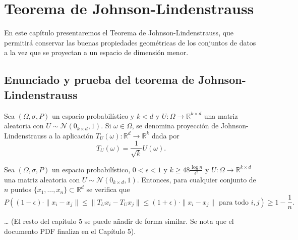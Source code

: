 \chapter{Teorema de Johnson-Lindenstrauss}

En este capítulo presentaremos el Teorema de Johnson-Lindenstrauss, que permitirá conservar las buenas propiedades geométricas de los conjuntos de datos a la vez que se proyectan a un espacio de dimensión menor.

\section{Enunciado y prueba del teorema de Johnson-Lindenstrauss}

\begin{definition}
Sea $(\Omega, \sigma, P)$ un espacio probabilístico y $k < d$ y $U : \Omega \to \mathbb{R}^{k \times d}$ una matriz aleatoria con $U \sim \mathcal{N}(0_{k \times d}, 1)$. Si $\omega \in \Omega$, se denomina proyección de Johnson-Lindenstrauss a la aplicación $T_U(\omega) : \mathbb{R}^d \to \mathbb{R}^k$ dada por
\[ T_U(\omega) = \frac{1}{\sqrt{k}} U(\omega). \]
\end{definition}

\begin{theorem}
Sea $(\Omega, \sigma, P)$ un espacio probabilístico, $0 < \epsilon < 1$ y $k \geq 48 \frac{\log n}{\epsilon^2}$ y $U : \Omega \to \mathbb{R}^{k \times d}$ una matriz aleatoria con $U \sim \mathcal{N}(0_{k \times d}, 1)$. Entonces, para cualquier conjunto de $n$ puntos $\{x_1, \dots, x_n\} \subset \mathbb{R}^d$ se verifica que
\[ P \left( (1 - \epsilon) \cdot \|x_i - x_j\| \leq \|T_U x_i - T_U x_j\| \leq (1 + \epsilon) \cdot \|x_i - x_j\| \text{ para todo } i, j \right) \geq 1 - \frac{1}{n}. \]
\end{theorem}

\dots
(El resto del capítulo 5 se puede añadir de forma similar. Se nota que el documento PDF finaliza en el Capítulo 5).
